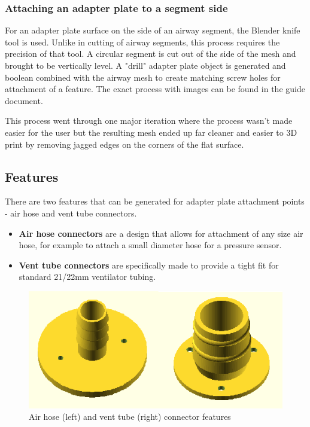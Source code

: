 \documentclass[MME,Projekt,english]{twbook}%
\begin{document}
\subsubsection{Attaching an adapter plate to a segment side}

For an adapter plate surface on the side of an airway segment, the Blender knife tool is used. Unlike in cutting of airway segments,
this process requires the precision of that tool. A circular segment is cut out of the side of the mesh and brought to be vertically
level. A "drill" adapter plate object is generated and boolean combined with the airway mesh to create matching screw holes for attachment
of a feature. The exact process with images can be found in the guide document.

This process went through one major iteration where the process wasn't made easier for the user but the resulting mesh ended up
far cleaner and easier to 3D print by removing jagged edges on the corners of the flat surface.

\subsection{Features}

There are two features that can be generated for adapter plate attachment points - air hose and vent tube connectors.

\begin{itemize}
	\item \textbf{Air hose connectors} are a design that allows for attachment of any size air hose, for example to attach a small diameter hose for a pressure sensor.
	\item \textbf{Vent tube connectors} are specifically made to provide a tight fit for standard 21/22mm ventilator tubing.
\end{itemize}

\begin{figure}[!htbp]
	\centering
	\includegraphics[width=.5\linewidth]{images/features.png}
	\caption{Air hose (left) and vent tube (right) connector features}\label{features}
\end{figure}
\end{document}
